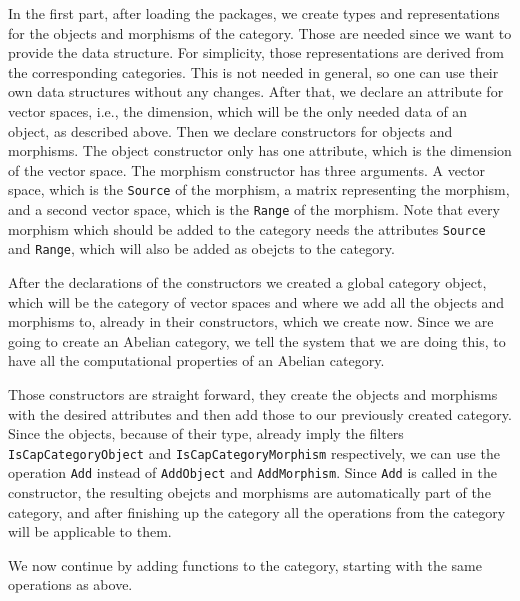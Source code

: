 In the first part, after loading the packages, we create types and representations for the objects
and morphisms of the category. Those are needed since we want to provide the data structure. For simplicity,
those representations are derived from the corresponding \CapPkg \GAP categories. This is not needed in general,
so one can use their own data structures without any changes. After that, we declare an attribute for vector spaces,
i.e., the dimension, which will be the only needed data of an object, as described above. Then we declare constructors
for objects and morphisms. The object constructor only has one attribute, which is the dimension of the vector space.
The morphism constructor has three arguments. A vector space, which is the \texttt{Source} of the morphism, a matrix
representing the morphism, and a second vector space, which is the \texttt{Range} of the morphism. Note that every morphism
which should be added to the category needs the \GAP attributes \texttt{Source} and \texttt{Range}, which will also be
added as obejcts to the category.



After the declarations of the constructors we created a global category \GAP object, which will be the category
of vector spaces and where we add all the objects and morphisms to, already in their constructors, which we create now.
Since we are going to create an Abelian category, we tell the system that we are doing this, to have all the computational
properties of an Abelian category.



Those constructors are straight forward, they create the objects and morphisms with the desired attributes and then
add those to our previously created category. Since the objects, because of their type, already imply the \GAP filters
\texttt{IsCapCategoryObject} and \texttt{IsCapCategoryMorphism} respectively, we can use the operation \texttt{Add} instead
of \texttt{AddObject} and \texttt{AddMorphism}. Since \texttt{Add} is called in the constructor, the resulting obejcts and
morphisms are automatically part of the category, and after finishing up the category all the operations from the
category will be applicable to them.

We now continue by adding functions to the category, starting with the same operations as above.



